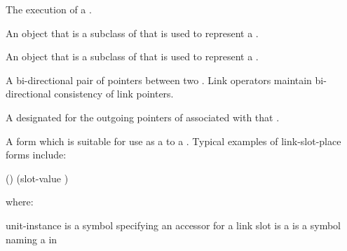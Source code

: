 \documentclass[10pt,twoside,english,pdftex]{article}
\begin{document}
\begin{glossary-list}

\glent[KS~execution]
%
%
%
%
The execution of a .


\glent[ks~class]
%
%
%
%
An object that is a subclass of
\textbf{} that is used to represent a
.


%
%
%
%
An object that is a subclass of \textbf{}
that is used to represent a .


\glent[link]
%
%
A bi-directional pair of pointers between two .
Link operators maintain bi-directional consistency of link pointers.


%
%
A  designated for the outgoing pointers of 
associated with that .


%
%
%
A form which is suitable for use as a  to
a .  Typical examples of link-slot-place forms
include:
\T\vspace{2pt}
\begin{example}
  ()
  (slot-value )
\end{example}
where:
\begin{args}{unit-instance}
 is a symbol specifying an accessor  for a
link slot 
 is a 
 is a symbol naming a  in
\end{args}


\end{glossary-list}
\end{document}
